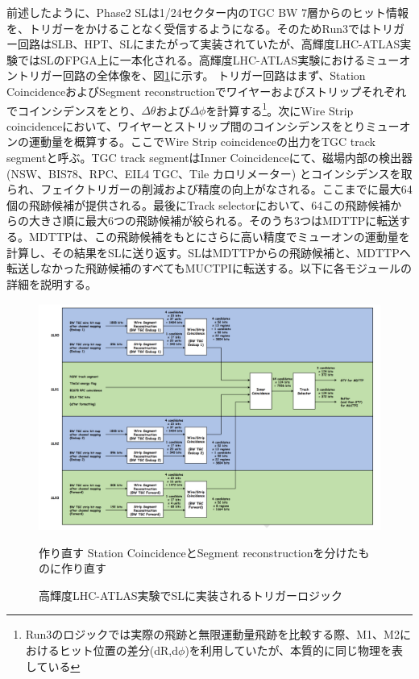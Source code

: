 前述したように、Phase2 SLは1/24セクター内のTGC BW 7層からのヒット情報を、トリガーをかけることなく受信するようになる。そのためRun3ではトリガー回路はSLB、HPT、SLにまたがって実装されていたが、高輝度LHC-ATLAS実験ではSLのFPGA上に一本化される。高輝度LHC-ATLAS実験におけるミューオントリガー回路の全体像を、図\ref{Trigger_overview}に示す。
トリガー回路はまず、Station CoincidenceおよびSegment reconstructionでワイヤーおよびストリップそれぞれでコインシデンスをとり、$\Delta\theta$および$\Delta\phi$を計算する\footnote{Run3のロジックでは実際の飛跡と無限運動量飛跡を比較する際、M1、M2におけるヒット位置の差分(dR,d$\phi$)を利用していたが、本質的に同じ物理を表している}。次にWire Strip coincidenceにおいて、ワイヤーとストリップ間のコインシデンスをとりミューオンの運動量を概算する。ここでWire Strip coincidenceの出力をTGC track segmentと呼ぶ。TGC track segmentはInner Coincidenceにて、磁場内部の検出器 (NSW、BIS78、RPC、EIL4 TGC、Tile カロリメーター) とコインシデンスを取られ、フェイクトリガーの削減および\pt 精度の向上がなされる。ここまでに最大64個の飛跡候補が提供される。最後にTrack selectorにおいて、64この飛跡候補から\pt の大きさ順に最大6つの飛跡候補が絞られる。そのうち3つはMDTTPに転送する。MDTTPは、この飛跡候補をもとにさらに高い精度でミューオンの運動量を計算し、その結果をSLに送り返す。SLはMDTTPからの飛跡候補と、MDTTPへ転送しなかった飛跡候補のすべてもMUCTPIに転送する。以下に各モジュールの詳細を説明する。


\begin{figure} 
    \centering
    \includegraphics[width=16cm]{fig/SL/Trigger_overview.png}
    \caption[高輝度LHC-ATLAS実験でSLに実装されるトリガーロジックの全体像]{高輝度LHC-ATLAS実験でSLに実装されるトリガーロジック}
    \begin{itembox}{作り直す}
        Station CoincidenceとSegment reconstructionを分けたものに作り直す
    \end{itembox}
    \label{Trigger_overview}
\end{figure}

